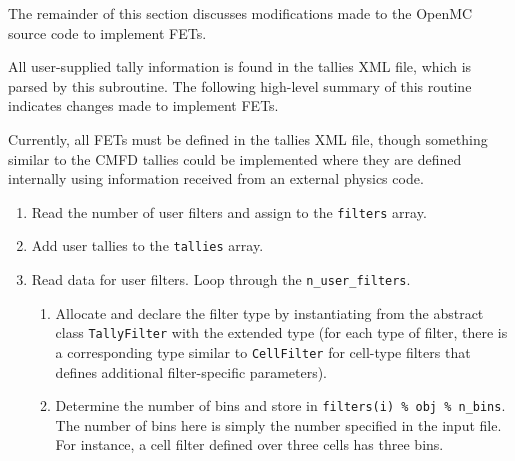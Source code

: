 \documentclass[10pt]{article}
\newcounter{subsubsubsection}[subsubsection]
\numberwithin{equation}{section} %
\begin{document}
The remainder of this section discusses modifications made to the OpenMC source code to implement FETs.

All user-supplied tally information is found in the tallies XML file, which is parsed by this subroutine. The following high-level summary of this routine indicates changes made to implement FETs.

\color{magenta}
Currently, all FETs must be defined in the tallies XML file, though something similar to the CMFD tallies could be implemented where they are defined internally using information received from an external physics code.
\color{black}

\begin{enumerate}
\item Read the number of user filters and assign to the {\tt filters} array. %
\item Add user tallies to the {\tt tallies} array.%
\item Read data for user filters. Loop through the {\tt n\_user\_filters}.
	\begin{enumerate}
	\item Allocate and declare the filter type by instantiating from the abstract class {\tt TallyFilter} with the extended type (for each type of filter, there is a corresponding type similar to {\tt CellFilter} for cell-type filters that defines additional filter-specific parameters).
	\item Determine the number of bins and store in {\tt filters(i) \% obj \% n\_bins}. The number of bins here is simply the number specified in the input file. For instance, a cell filter defined over three cells has three bins.

\end{enumerate}
\end{enumerate}
\end{document}
